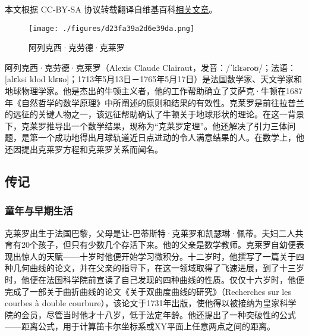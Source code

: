 
本文根据 CC-BY-SA 协议转载翻译自维基百科\href{https://en.wikipedia.org/wiki/Alexis_Clairaut}{相关文章}。
\begin{figure}[ht]
\centering
\texttt{[image: ./figures/d23fa39a2d6e39da.png]}
\caption{阿列克西·克劳德·克莱罗} \label{fig_Alexis_1}
\end{figure}
阿列克西·克劳德·克莱罗（Alexis Claude Clairaut，发音：/ˈklɛəroʊ/；法语：[alɛksi klod klɛʁo]；1713年5月13日－1765年5月17日）是法国数学家、天文学家和地球物理学家。他是杰出的牛顿主义者，他的工作帮助确立了艾萨克·牛顿在1687年《自然哲学的数学原理》中所阐述的原则和结果的有效性。克莱罗是前往拉普兰的远征的关键人物之一，该远征帮助确认了牛顿关于地球形状的理论。在这一背景下，克莱罗推导出一个数学结果，现称为“克莱罗定理”。他还解决了引力三体问题，是第一个成功地得出月球轨道近日点进动的令人满意结果的人。在数学上，他还因提出克莱罗方程和克莱罗关系而闻名。
\subsection{传记}  
\subsubsection{童年与早期生活}  
克莱罗出生于法国巴黎，父母是让-巴蒂斯特·克莱罗和凯瑟琳·佩蒂。夫妇二人共育有20个孩子，但只有少数几个存活下来。他的父亲是数学教师。克莱罗自幼便表现出惊人的天赋——十岁时他便开始学习微积分。十二岁时，他撰写了一篇关于四种几何曲线的论文，并在父亲的指导下，在这一领域取得了飞速进展，到了十三岁时，他便在法国科学院前宣读了自己发现的四种曲线的性质。仅仅十六岁时，他便完成了一部关于曲折曲线的论文《关于双曲度曲线的研究》（Recherches sur les courbes à double courbure），该论文于1731年出版，使他得以被接纳为皇家科学院的会员，尽管当时他才十八岁，低于法定年龄。他还提出了一种突破性的公式——距离公式，用于计算笛卡尔坐标系或XY平面上任意两点之间的距离。

